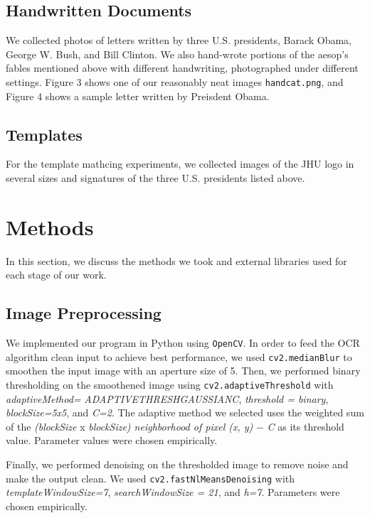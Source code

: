 \documentclass[11pt,letterpaper]{article}
\begin{document}
\subsection{Handwritten Documents}

We collected photos of letters written by three U.S. presidents, Barack Obama, George W. Bush, and Bill Clinton. We also hand-wrote portions of the aesop's fables mentioned above with different handwriting, photographed under different settings. Figure 3 shows one of our reasonably neat images {\tt hand\textunderscore cat.png}, and Figure 4 shows a sample letter written by Preisdent Obama.

\subsection{Templates}

For the template mathcing experiments, we collected images of the JHU logo in several sizes and signatures of the three U.S. presidents listed above.

\section{Methods}

In this section, we discuss the methods we took and external libraries used for each stage of our work.

\subsection{Image Preprocessing}

We implemented our program in Python using {\tt OpenCV}. In order to feed the OCR algorithm clean input to achieve best performance, we used {\tt cv2.medianBlur} to smoothen the input image with an aperture size of 5. Then, we performed binary thresholding on the smoothened image using {\tt cv2.adaptiveThreshold} with \textit{adaptiveMethod=} \textit{ ADAPTIVE\textunderscore THRESH\textunderscore GAUSSIAN\textunderscore C}, \textit{threshold = binary}, \textit{blockSize=5x5}, and \textit{C=2}. The adaptive method we selected uses the weighted sum of the \textit{(blockSize} x \textit{blockSize) neighborhood of pixel (x, y)} $-$ \textit{C} as its threshold value. Parameter values were chosen empirically.

Finally, we performed denoising on the thresholded image to remove noise and make the output clean. We used {\tt cv2.fastNlMeansDenoising} with \textit{templateWindowSize=7}, \textit{searchWindowSize = 21}, and \textit{h=7}. Parameters were chosen empirically.
\end{document}
